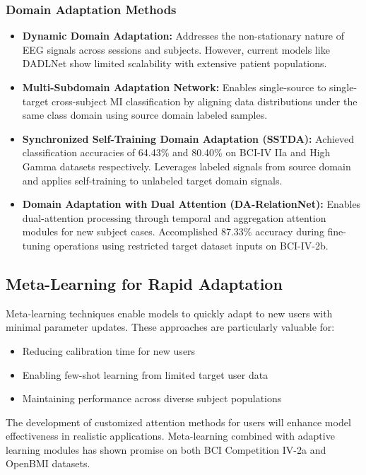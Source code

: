 \documentclass[12pt]{article}
\begin{document}
\subsubsection{Domain Adaptation Methods}
\begin{itemize}
    \item \textbf{Dynamic Domain Adaptation:} Addresses the non-stationary nature of EEG signals across sessions and subjects. However, current models like DADLNet show limited scalability with extensive patient populations.
    \item \textbf{Multi-Subdomain Adaptation Network:} Enables single-source to single-target cross-subject MI classification by aligning data distributions under the same class domain using source domain labeled samples.
    \item \textbf{Synchronized Self-Training Domain Adaptation (SSTDA):} Achieved classification accuracies of 64.43\% and 80.40\% on BCI-IV IIa and High Gamma datasets respectively. Leverages labeled signals from source domain and applies self-training to unlabeled target domain signals.
    \item \textbf{Domain Adaptation with Dual Attention (DA-RelationNet):} Enables dual-attention processing through temporal and aggregation attention modules for new subject cases. Accomplished 87.33\% accuracy during fine-tuning operations using restricted target dataset inputs on BCI-IV-2b.
\end{itemize}

\subsection{Meta-Learning for Rapid Adaptation}

Meta-learning techniques enable models to quickly adapt to new users with minimal parameter updates. These approaches are particularly valuable for:
\begin{itemize}
    \item Reducing calibration time for new users
    \item Enabling few-shot learning from limited target user data
    \item Maintaining performance across diverse subject populations
\end{itemize}

The development of customized attention methods for users will enhance model effectiveness in realistic applications. Meta-learning combined with adaptive learning modules has shown promise on both BCI Competition IV-2a and OpenBMI datasets.
\end{document}
